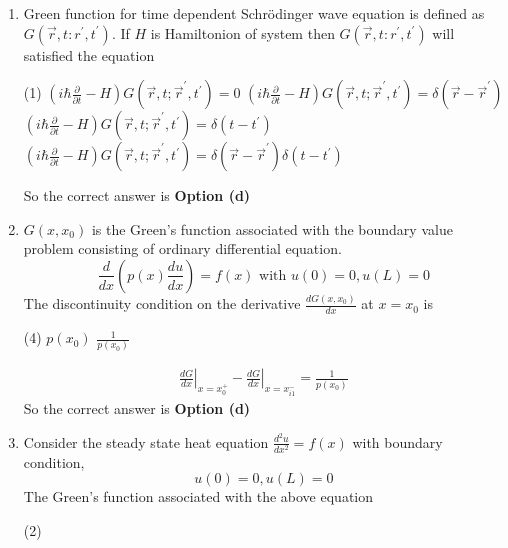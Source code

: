 \begin{enumerate}[label=\color{ocre}\textbf{\arabic*.}]
	\item Green function for time dependent Schrödinger wave equation is defined as $G\left(\vec{r}, t: r^{\prime}, t^{\prime}\right)$. If $H$ is Hamiltonion of system then $G\left(\vec{r}, t: r^{\prime}, t^{\prime}\right)$ will satisfied the equation
	 \begin{tasks}(1)
		\task[\textbf{a.}]$\left(i \hbar \frac{\partial}{\partial t}-H\right) G\left(\vec{r}, t ; \vec{r}^{\prime}, t^{\prime}\right)=0$
		\task[\textbf{b.}]$\left(i \hbar \frac{\partial}{\partial t}-H\right) G\left(\vec{r}, t ; \vec{r}^{\prime}, t^{\prime}\right)=\delta\left(\vec{r}-\vec{r}^{\prime}\right)$
		\task[\textbf{c.}] $\left(i \hbar \frac{\partial}{\partial t}-H\right) G\left(\vec{r}, t ; \vec{r}^{\prime}, t^{\prime}\right)=\delta\left(t-t^{\prime}\right)$
		\task[\textbf{d.}]  $\left(i \hbar \frac{\partial}{\partial t}-H\right) G\left(\vec{r}, t ; \vec{r}^{\prime}, t^{\prime}\right)=\delta\left(\vec{r}-\vec{r}^{\prime}\right) \delta\left(t-t^{\prime}\right)$
	\end{tasks}
\begin{answer}
So the correct answer is \textbf{Option (d)}
\end{answer}
	\item $G\left(x, x_{0}\right)$ is the Green's function associated with the boundary value problem consisting of ordinary differential equation.
	$$
	\frac{d}{d x}\left(p(x) \frac{d u}{d x}\right)=f(x) \text { with } u(0)=0, u(L)=0
	$$
	The discontinuity condition on the derivative $\frac{d G\left(x, x_{0}\right)}{d x}$ at $x=x_{0}$ is
	 \begin{tasks}(4)
		\task[\textbf{b.}]$p\left(x_{0}\right)$
		\task[\textbf{d.}] $\frac{1}{p\left(x_{0}\right)}$
	\end{tasks}
\begin{answer}
	\begin{align*}
	\left.\frac{d G}{d x}\right|_{x=x_{0}^{+}}-\left.\frac{d G}{d x}\right|_{x=x_{i 1}^{-}}=\frac{1}{p\left(x_{0}\right)}
	\end{align*}
	So the correct answer is \textbf{Option (d)}
\end{answer}
\item Consider the steady state heat equation $\frac{d^{2} u}{d x^{2}}=f(x)$ with boundary condition,
$$
u(0)=0, u(L)=0
$$
The Green's function associated with the above equation
 \begin{tasks}(2)

\end{tasks}
\end{enumerate}
